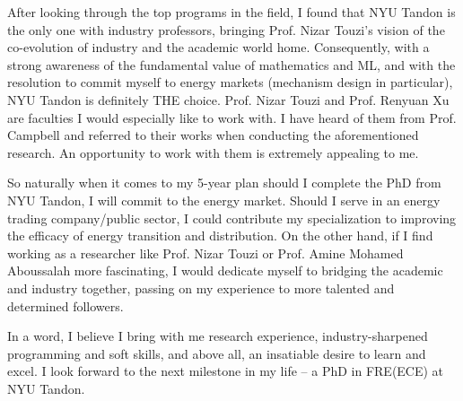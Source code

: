 \documentclass[12pt, a4paper]{article}
\newcommand{\schoolShort}{NYU Tandon\xspace}
\newcommand{\NT}{Prof. Nizar Touzi\xspace}
\newcommand{\RX}{Prof. Renyuan Xu\xspace}
\newcommand{\AAb}{Prof. Amine Mohamed Aboussalah\xspace}
\begin{document}
After looking through the top programs in the field, I found that \schoolShort is the only one with industry professors, bringing \NT's vision of the co-evolution of industry and the academic world home. Consequently, with a strong awareness of the fundamental value of mathematics and ML, and with the resolution to commit myself to energy markets (mechanism design in particular), \schoolShort is definitely THE choice. \NT and \RX are faculties I would especially like to work with. I have heard of them from Prof. Campbell and referred to their works when conducting the aforementioned research. An opportunity to work with them is extremely appealing to me. %

So naturally when it comes to my 5-year plan should I complete the PhD from NYU Tandon, I will commit to the energy market. Should I serve in an energy trading company/public sector, I could contribute my specialization to improving the efficacy of energy transition and distribution. On the other hand, if I find working as a researcher like \NT or \AAb more fascinating, I would dedicate myself to bridging the academic and industry together, passing on my experience to more talented and determined followers.

In a word, I believe I bring with me research experience, industry-sharpened programming and soft skills, and above all, an insatiable desire to learn and excel. I look forward to the next milestone in my life -- a PhD in FRE(ECE) at \schoolShort.



\end{document}
